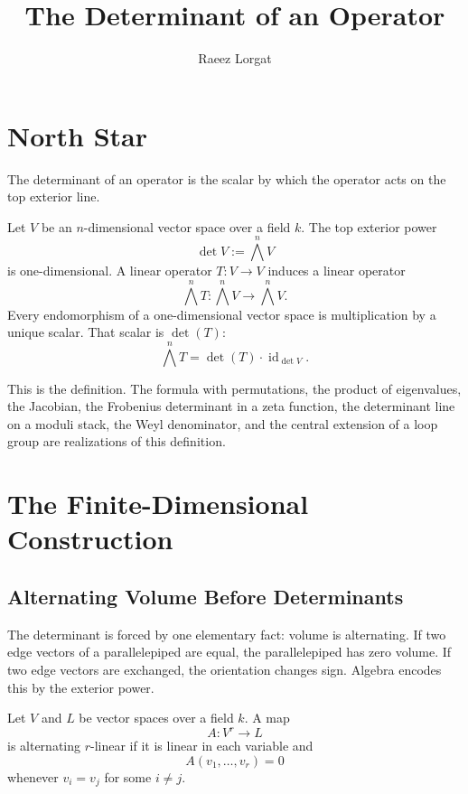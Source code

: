 \documentclass[11pt]{memoir}
\title{The Determinant of an Operator}
\author{Raeez Lorgat}
\date{}
\newcommand{\id}{\operatorname{id}}
\begin{document}
\maketitle
\tableofcontents

\chapter*{North Star}

The determinant of an operator is the scalar by which the operator acts
on the top exterior line.

Let \(V\) be an \(n\)-dimensional vector space over a field \(k\). The
top exterior power
\[
  \det V := \bigwedge^{n}V
\]
is one-dimensional. A linear operator \(T:V\to V\) induces a linear
operator
\[
  \bigwedge^{n}T:\bigwedge^{n}V\longrightarrow \bigwedge^{n}V.
\]
Every endomorphism of a one-dimensional vector space is multiplication
by a unique scalar. That scalar is \(\det(T)\):
\[
  \bigwedge^{n}T=\det(T)\cdot \id_{\det V}.
\]

This is the definition. The formula with permutations, the product of
eigenvalues, the Jacobian, the Frobenius determinant in a zeta
function, the determinant line on a moduli stack, the Weyl denominator,
and the central extension of a loop group are realizations of this
definition.

\chapter{The Finite-Dimensional Construction}
\label{ch:finite}

\section{Alternating Volume Before Determinants}
\label{sec:alternating-volume}

The determinant is forced by one elementary fact: volume is alternating.
If two edge vectors of a parallelepiped are equal, the parallelepiped
has zero volume. If two edge vectors are exchanged, the orientation
changes sign. Algebra encodes this by the exterior power.

\begin{definition}
\label{def:alternating-map}
Let \(V\) and \(L\) be vector spaces over a field \(k\). A map
\[
  A:V^r\to L
\]
is alternating \(r\)-linear if it is linear in each variable and
\[
  A(v_1,\dots,v_r)=0
\]
whenever \(v_i=v_j\) for some \(i\neq j\).
\end{definition}
\end{document}
